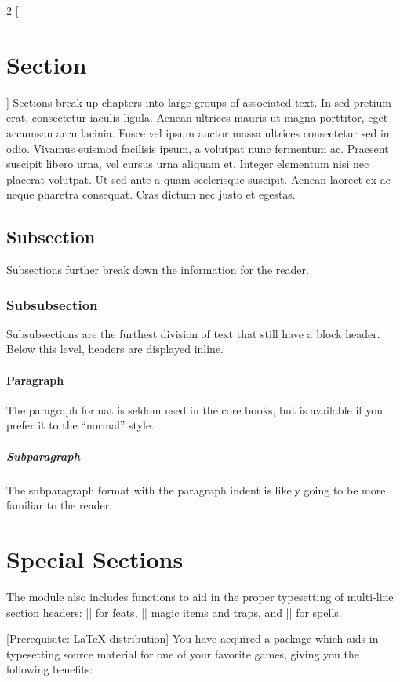 \documentclass[letterpaper,openany,nodeprecatedcode]{dndbook}
\begin{document}
\begin{multicols}{2}
  [
      \section{Section}
  ]
  Sections break up chapters into large groups of associated text. In sed pretium erat, consectetur iaculis ligula. Aenean ultrices mauris ut magna porttitor, eget accumsan arcu lacinia. Fusce vel ipsum auctor massa ultrices consectetur sed in odio. Vivamus euismod facilisis ipsum, a volutpat nunc fermentum ac. Praesent suscipit libero urna, vel cursus urna aliquam et. Integer elementum nisi nec placerat volutpat. Ut sed ante a quam scelerisque suscipit. Aenean laoreet ex ac neque pharetra consequat. Cras dictum nec justo et egestas.
  
  \subsection{Subsection}
  Subsections further break down the information for the reader.

  \subsubsection{Subsubsection}
  Subsubsections are the furthest division of text that still have a block header. Below this level, headers are displayed inline.

  \paragraph{Paragraph}
  The paragraph format is seldom used in the core books, but is available if you prefer it to the ``normal'' style.

  \subparagraph{Subparagraph}
  The subparagraph format with the paragraph indent is likely going to be more familiar to the reader.

  \section{Special Sections}
  The module also includes functions to aid in the proper typesetting of multi-line section headers: |\DndFeatHeader| for feats, |\DndItemHeader| magic items and traps, and |\DndSpellHeader| for spells.

  [Prerequisite: \LaTeX{} distribution]
  You have acquired a package which aids in typesetting source material for one of your favorite games, giving you the following benefits:




\end{multicols}
\end{document}
